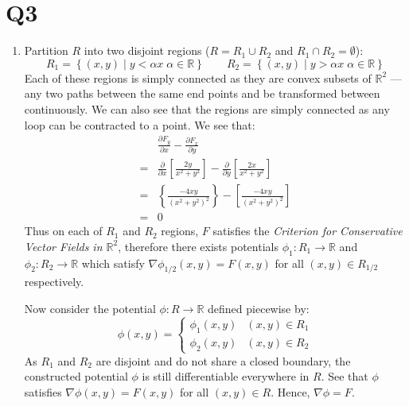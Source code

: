\documentclass[a4paper, 11pt]{article}
\newcommand{\RR}{\mathbb{R}}
\def\set#1{\left\{ #1 \right\}}
\def\pp#1#2{\frac{\partial #1}{\partial #2}}
\begin{document}
\section*{Q3}
\begin{enumerate}[label=(\alph*)]

	\item
	      Partition $R$ into two disjoint regions ($R=R_1\cup R_2$ and $R_1\cap R_2=\emptyset$):
	      $$R_1=\set{(x,y) \;|\; y<\alpha x\;\alpha\in\RR}\qquad R_2=\set{(x,y) \;|\; y>\alpha x\;\alpha\in\RR}$$
	      Each of these regions is simply connected as they are convex subsets of $\RR^2$ --- any two paths between the same end points and be transformed between continuously. We can also see that the regions are simply connected as any loop can be contracted to a point. We see that:
	      \begin{align*}
		        & \pp {F_y}x - \pp {F_x}y                                                                \\
		      = & \pp{}x \left[ \frac {2y}{x^2+y^2} \right] -\pp{}y \left[ \frac {2x}{x^2+y^2} \right]   \\
		      = & \left\{ \frac{-4xy}{(x^2 + y^2)^2} \right\} - \left[ \frac{-4xy}{(x^2 + y^2)^2}\right] \\
		      = & 0
	      \end{align*}
	      Thus on each of $R_1$ and $R_2$ regions, $F$ satisfies the \textit{Criterion for Conservative Vector Fields in $\RR^2$}, therefore there exists potentials $\phi_1:R_1\to\RR$ and $\phi_2:R_2\to\RR$ which satisfy $\nabla \phi_{1/2}(x,y)=F(x,y)$ for all $(x,y)\in R_{1/2}$  respectively.

	      Now consider the potential $\phi:R\to\RR$ defined piecewise by:
	      $$\phi(x,y)=\begin{cases}
			      \phi_1(x,y) & (x,y)\in R_1 \\
			      \phi_2(x,y) & (x,y)\in R_2
		      \end{cases}$$
	      As $R_1$ and $R_2$ are disjoint and do not share a closed boundary, the constructed potential $\phi$ is still differentiable everywhere in $R$. See that $\phi$ satisfies $\nabla \phi(x,y) = F(x,y)$ for all $(x,y)\in R$. Hence, $\nabla \phi = F$.




\end{enumerate}
\end{document}
